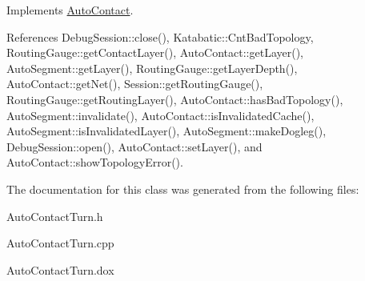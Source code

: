  

Implements \hyperlink{classKatabatic_1_1AutoContact_a690764ddc997fe9766a79c4b8e0c3e2f}{Auto\+Contact}.



References Debug\+Session\+::close(), Katabatic\+::\+Cnt\+Bad\+Topology, Routing\+Gauge\+::get\+Contact\+Layer(), Auto\+Contact\+::get\+Layer(), Auto\+Segment\+::get\+Layer(), Routing\+Gauge\+::get\+Layer\+Depth(), Auto\+Contact\+::get\+Net(), Session\+::get\+Routing\+Gauge(), Routing\+Gauge\+::get\+Routing\+Layer(), Auto\+Contact\+::has\+Bad\+Topology(), Auto\+Segment\+::invalidate(), Auto\+Contact\+::is\+Invalidated\+Cache(), Auto\+Segment\+::is\+Invalidated\+Layer(), Auto\+Segment\+::make\+Dogleg(), Debug\+Session\+::open(), Auto\+Contact\+::set\+Layer(), and Auto\+Contact\+::show\+Topology\+Error().



The documentation for this class was generated from the following files\+:\begin{DoxyCompactItemize}
\item 
Auto\+Contact\+Turn.\+h\item 
Auto\+Contact\+Turn.\+cpp\item 
Auto\+Contact\+Turn.\+dox\end{DoxyCompactItemize}
